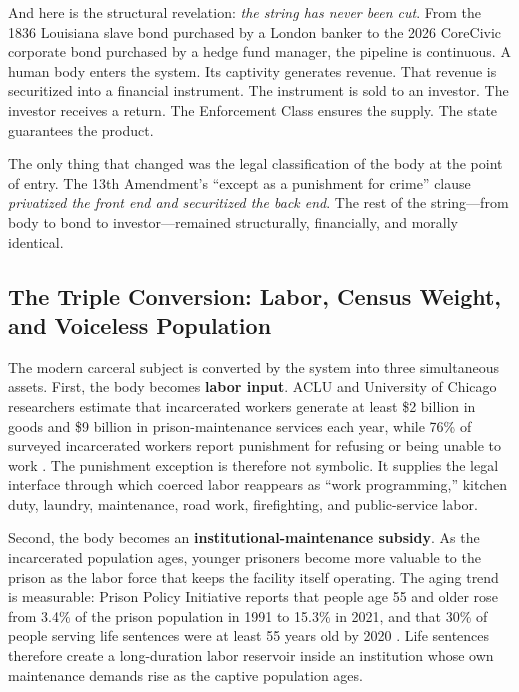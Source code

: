 And here is the structural revelation: \textit{the string has never been cut}. From the 1836 Louisiana slave bond purchased by a London banker to the 2026 CoreCivic corporate bond purchased by a hedge fund manager, the pipeline is continuous. A human body enters the system. Its captivity generates revenue. That revenue is securitized into a financial instrument. The instrument is sold to an investor. The investor receives a return. The Enforcement Class ensures the supply. The state guarantees the product.

The only thing that changed was the legal classification of the body at the point of entry. The 13th Amendment's ``except as a punishment for crime'' clause \textit{privatized the front end and securitized the back end}. The rest of the string---from body to bond to investor---remained structurally, financially, and morally identical.

\subsection{The Triple Conversion: Labor, Census Weight, and Voiceless Population}

The modern carceral subject is converted by the system into three simultaneous assets. First, the body becomes \textbf{labor input}. ACLU and University of Chicago researchers estimate that incarcerated workers generate at least \$2 billion in goods and \$9 billion in prison-maintenance services each year, while 76\% of surveyed incarcerated workers report punishment for refusing or being unable to work \cite{aclu_captive_labor_2022}. The punishment exception is therefore not symbolic. It supplies the legal interface through which coerced labor reappears as ``work programming,'' kitchen duty, laundry, maintenance, road work, firefighting, and public-service labor.

Second, the body becomes an \textbf{institutional-maintenance subsidy}. As the incarcerated population ages, younger prisoners become more valuable to the prison as the labor force that keeps the facility itself operating. The aging trend is measurable: Prison Policy Initiative reports that people age 55 and older rose from 3.4\% of the prison population in 1991 to 15.3\% in 2021, and that 30\% of people serving life sentences were at least 55 years old by 2020 \cite{ppi_aging_prisons_2023}. Life sentences therefore create a long-duration labor reservoir inside an institution whose own maintenance demands rise as the captive population ages.


